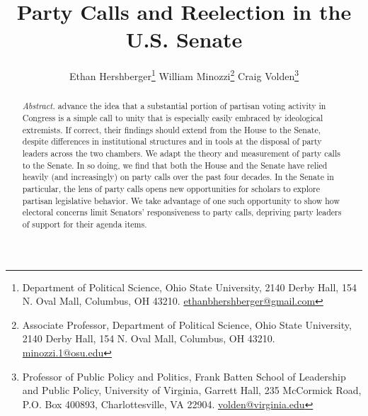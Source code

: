 \documentclass[12pt]{article}
\begin{document}
\title{\vspace{4em} \LARGE Party Calls and Reelection in the U.S. Senate}


\author{\large
Ethan Hershberger\footnote{
  \small Department of Political Science,
  Ohio State University, 2140 Derby Hall, 154 N. Oval Mall, Columbus, OH 43210.
  \href{mailto:ethanbhershberger@gmail.com}{ethanbhershberger@gmail.com}
}\quad
William Minozzi\footnote{
  \small Associate Professor, Department of Political Science,
  Ohio State University, 2140 Derby Hall, 154 N. Oval Mall, Columbus, OH 43210.
  \href{mailto:minozzi.1@osu.edu}{minozzi.1@osu.edu}
}\quad
Craig Volden\footnote{
  \small Professor of Public Policy and Politics, Frank Batten School of
  Leadership and Public Policy,
  University of Virginia, Garrett Hall, 235 McCormick Road, P.O. Box 400893,
  Charlottesville, VA 22904.
  \href{mailto:volden@virginia.edu}{volden@virginia.edu}
}\\
}



\maketitle

\thispagestyle{empty}
\setcounter{page}{0}

\clearpage

\thispagestyle{empty}
\setcounter{page}{0}


\doublespacing

\renewcommand{\abstractname}{}
\begin{abstract}
\noindent \textit{Abstract.}
\noindent
\cite{Minozzi:2013} advance the idea that a substantial portion of partisan
voting activity in Congress is a simple call to unity that is especially easily
embraced by ideological extremists.
If correct, their findings should extend from the House to the Senate, despite
differences in institutional structures and in tools at the disposal of party
leaders across the two chambers.
We adapt the theory and measurement of party calls to the Senate.
In so doing, we find that both the House and the Senate have relied heavily
(and increasingly) on party calls over the past four decades.
In the Senate in particular, the lens of party calls opens new opportunities
for scholars to explore partisan legislative behavior.
We take advantage of one such opportunity to show how electoral concerns limit
Senators' responsiveness to party calls, depriving party leaders of support for
their agenda items.
\end{abstract}
\end{document}
